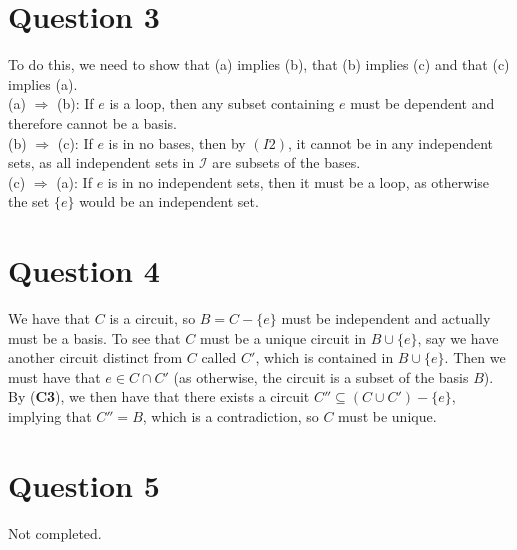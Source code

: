 \documentclass[a4paper, fleqn]{article}
\begin{document}
\section*{Question 3}
To do this, we need to show that (a) implies (b), that (b) implies (c) and that (c) implies (a).\\
(a) $\Rightarrow$ (b): If $e$ is a loop, then any subset containing $e$ must be dependent and therefore cannot be a basis. \\
(b) $\Rightarrow$ (c): If $e$ is in no bases, then by $(I2)$, it cannot be in any independent sets, as all independent sets in $\mathcal{I}$ are subsets of the bases. \\
(c) $\Rightarrow$ (a): If $e$ is in no independent sets, then it must be a loop, as otherwise the set $\{e\}$ would be an independent set.

\section*{Question 4}
We have that $C$ is a circuit, so $B=C-\{e\}$ must be independent and actually must be a
basis. To see that $C$ must be a unique circuit in $B\cup \{e\}$, say we have another
circuit distinct from $C$ called $C'$, which is contained in $B\cup \{e\}$. Then we must
have that $e\in C\cap C'$ (as otherwise, the circuit is a subset of the basis $B$). By
(\textbf{C3}), we then have that there exists a circuit $C''\subseteq (C\cup C')-\{e\}$,
implying that $C''=B$, which is a contradiction, so $C$ must be unique.

\section*{Question 5}
Not completed.
\end{document}
